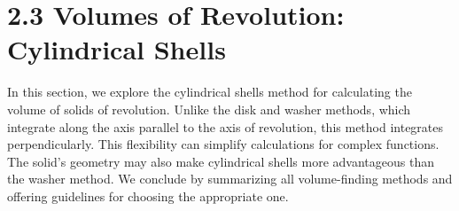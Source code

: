 \documentclass{report}
\begin{document}
    \pagebreak 
    \section*{2.3 Volumes of Revolution: Cylindrical Shells}
    \bigbreak \noindent 
    In this section, we explore the cylindrical shells method for calculating the volume of solids of revolution. Unlike the disk and washer methods, which integrate along the axis parallel to the axis of revolution, this method integrates perpendicularly. This flexibility can simplify calculations for complex functions. The solid's geometry may also make cylindrical shells more advantageous than the washer method. We conclude by summarizing all volume-finding methods and offering guidelines for choosing the appropriate one.
    \smallbreak \noindent
\end{document}
